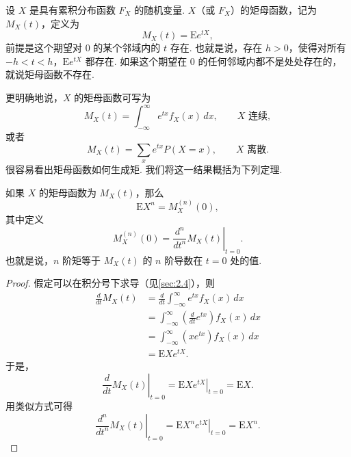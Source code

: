 \begin{definition}\label{def:2.3.6}
设 $X$ 是具有累积分布函数 $F_X$ 的随机变量. $X$（或 $F_X$）的矩母函数，记为 $M_X(t)$，定义为
$$M_X(t)=\mathrm Ee^{tX},$$
前提是这个期望对 $0$ 的某个邻域内的 $t$ 存在. 也就是说，存在 $h>0$，使得对所有 $-h<t<h$，$\mathrm Ee^{tX}$ 都存在. 如果这个期望在 $0$ 的任何邻域内都不是处处存在的，就说矩母函数不存在.
\end{definition}
更明确地说，$X$ 的矩母函数可写为
$$M_X(t)=\int_{-\infty}^\infty e^{tx}f_X(x)\,dx,\qquad X\text{ 连续},$$
或者
$$M_X(t)=\sum_x e^{tx}P(X=x),\qquad X\text{ 离散}.$$
很容易看出矩母函数如何生成矩. 我们将这一结果概括为下列定理.
\begin{theorem}\label{thm:2.3.7}
如果 $X$ 的矩母函数为 $M_X(t)$，那么
$$\mathrm EX^n=M_X^{(n)}(0),$$
其中定义
$$M_X^{(n)}(0)=\left.\frac{d^n}{dt^n}M_X(t)\right|_{t=0}.$$
也就是说，$n$ 阶矩等于 $M_X(t)$ 的 $n$ 阶导数在 $t=0$ 处的值.
\end{theorem}
\begin{proof}
假定可以在积分号下求导（见\autoref{sec:2.4}），则
$$\begin{aligned}
\frac d{dt}M_X(t)&=\frac d{dt}\int_{-\infty}^\infty e^{tx}f_X(x)\,dx\\
&=\int_{-\infty}^\infty\left(\frac d{dt}e^{tx}\right)f_X(x)\,dx\\
&=\int_{-\infty}^\infty(xe^{tx})f_X(x)\,dx\\
&=\mathrm EXe^{tX}.
\end{aligned}$$
于是，
$$\left.\frac d{dt}M_X(t)\right|_{t=0}=\left.\mathrm EXe^{tX}\right|_{t=0}=\mathrm EX.$$
用类似方式可得
$$\left.\frac{d^n}{dt^n}M_X(t)\right|_{t=0}=\left.\mathrm EX^ne^{tX}\right|_{t=0}=\mathrm EX^n.$$
\end{proof}


